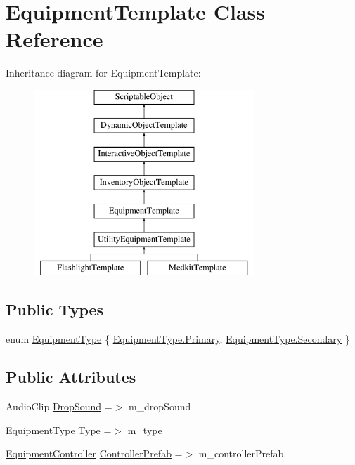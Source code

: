 \hypertarget{class_equipment_template}{}\section{Equipment\+Template Class Reference}
\label{class_equipment_template}
Inheritance diagram for Equipment\+Template\+:\begin{figure}[H]
\begin{center}
\leavevmode
\includegraphics[height=7.000000cm]{class_equipment_template}
\end{center}
\end{figure}
\subsection*{Public Types}
\begin{DoxyCompactItemize}
\item 
enum \mbox{\hyperlink{class_equipment_template_ad390a9e6257d1d050f5d5fb5a8756633}{Equipment\+Type}} \{ \mbox{\hyperlink{class_equipment_template_ad390a9e6257d1d050f5d5fb5a8756633a074de7e7c226d5c60f8af14c20725352}{Equipment\+Type.\+Primary}}, 
\mbox{\hyperlink{class_equipment_template_ad390a9e6257d1d050f5d5fb5a8756633a0c7d6cf19426e01dcfa32434828ed266}{Equipment\+Type.\+Secondary}}
 \}
\end{DoxyCompactItemize}
\subsection*{Public Attributes}
\begin{DoxyCompactItemize}
\item 
Audio\+Clip \mbox{\hyperlink{class_equipment_template_a2e22963c9802dc299435eaab31bc9cc8}{Drop\+Sound}} =$>$ m\+\_\+drop\+Sound
\item 
\mbox{\hyperlink{class_equipment_template_ad390a9e6257d1d050f5d5fb5a8756633}{Equipment\+Type}} \mbox{\hyperlink{class_equipment_template_a9c4a46351a20f28c4054c18af7a9f256}{Type}} =$>$ m\+\_\+type
\item 
\mbox{\hyperlink{class_equipment_controller}{Equipment\+Controller}} \mbox{\hyperlink{class_equipment_template_a7fd8eb098357a159094c533acb57c605}{Controller\+Prefab}} =$>$ m\+\_\+controller\+Prefab
\end{DoxyCompactItemize}


